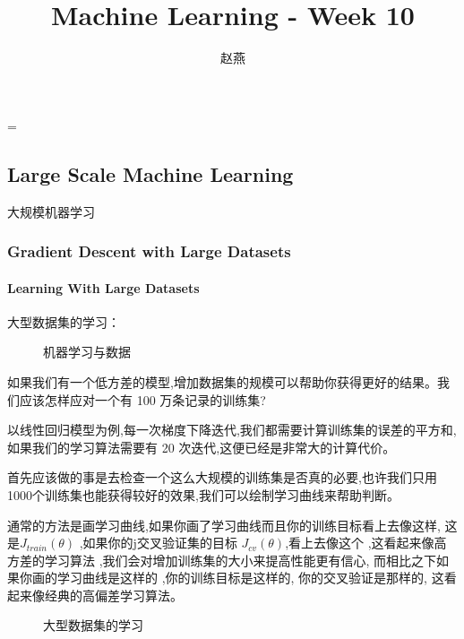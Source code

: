 \documentclass{article}
\title{Machine Learning - Week 10}
\author{赵燕}
\date{}
\begin{document}
 
\hfuzz=\maxdimen
{}
\begin{CJK}{UTF8}{gbsn} 
\maketitle
\renewcommand\contentsname{目录}
\renewcommand\figurename{图}
\tableofcontents
\newpage

\part{Large Scale Machine Learning}
\subparagraph{}
大规模机器学习
\section{Gradient Descent with Large Datasets}
\subsection{Learning With Large Datasets}
\subparagraph{}
大型数据集的学习：
\begin{figure}[H]
\caption{机器学习与数据}
\label{fig:1001}
\end{figure}
\subparagraph{}
如果我们有一个低方差的模型,增加数据集的规模可以帮助你获得更好的结果。我们应该怎样应对一个有 100 万条记录的训练集?
\subparagraph{}
以线性回归模型为例,每一次梯度下降迭代,我们都需要计算训练集的误差的平方和,如果我们的学习算法需要有 20 次迭代,这便已经是非常大的计算代价。
\subparagraph{}
首先应该做的事是去检查一个这么大规模的训练集是否真的必要,也许我们只用 1000个训练集也能获得较好的效果,我们可以绘制学习曲线来帮助判断。
\subparagraph{}
通常的方法是画学习曲线,如果你画了学习曲线而且你的训练目标看上去像这样, 这是$J_{train}(θ)$ ,如果你的j交叉验证集的目标 $J_{cv}(θ)$,看上去像这个 ,这看起来像高方差的学习算法 ,我们会对增加训练集的大小来提高性能更有信心, 而相比之下如果你画的学习曲线是这样的 ,你的训练目标是这样的, 你的交叉验证是那样的, 这看起来像经典的高偏差学习算法。
\begin{figure}[H]
\label{fig:11103}
\caption{大型数据集的学习}
\end{figure}
\begin{figure}[H]
\label{fig:11102}
\end{figure}

\end{CJK}
\end{document}
